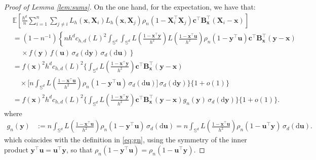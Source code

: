\documentclass[12pt]{report} %
\newcommand{\bX}{\mathbf{X}}
\newcommand{\bx}{\mathbf{x}}
\newcommand{\by}{\mathbf{y}}
\newcommand{\bc}{\mathbf{c}}
\newcommand{\bu}{\boldsymbol{u}}
\newcommand{\sigmad}{\sigma_{d}}
\newcommand{\rd}{\mathrm{d}}
\newcommand{\Sd}{\mathbb{S}^{d}}
\newcommand{\bB}{\mathbf{B}}
\begin{document}
\begin{proof}[Proof of Lemma \ref{lem:sums}]
On the one hand, for the expectation, we have that:
\begin{align}
&\mathbb{E}\!\left[
\frac{h^d}{n} \sum_{i=1}^n\sum_{j\neq i} 
L_h\left(\bx, \bX_i\right)L_h\left(\bx, \bX_j\right)
\rho_n\left(1-\bX_i^\top\bX_j\right)
\bc^\top\bB_{\bx}^\top\left(\bX_i -\bx\right)
\right] \nonumber \\
&= (1 - n^{-1}) \left\{
    n h^d c_{h,d}(L)^2
    \int_{\Sd} \int_{\Sd}
    L\!\left(\frac{1 - \bx^\top \by}{h^2}\right)
    L\!\left(\frac{1 - \bx^\top \bu}{h^2}\right)
    \rho_n\left(1 - \by^\top \bu\right) 
    \bc^\top\bB_{\bx}^\top\left(\by -\bx\right) \right. \nonumber \\
&\left. \quad \, \times f(\by)\, f(\bu)
    \,\sigmad(\rd\by)
    \,\sigmad(\rd\bu)
\right\}\nonumber \\
&= f(\bx)^2 h^d c_{h,d}(L)^2
\Biggl\{
\int_{\Sd}
L\!\left(\frac{1-\bx^\top\by}{h^2}\right)
\bc^\top\bB_{\bx}^\top(\by-\bx)
\nonumber\\
&\quad \times
\Biggl[
n \int_{\Sd}
L\!\left(\frac{1-\bx^\top\bu}{h^2}\right)
\rho_n(1-\by^\top\bu)
\,\sigmad(\rd\bu)
\Biggr]
\,\sigmad(\rd\by)
\Biggr\}
\{1+o(1)\}
\nonumber\\
&= f(\bx)^2 h^d c_{h,d}(L)^2
\Biggl\{
\int_{\Sd}
L\!\left(\frac{1-\bx^\top\by}{h^2}\right)
\bc^\top\bB_{\bx}^\top(\by-\bx)
g_n(\by)
\,\sigmad(\rd\by)
\Biggr\}
\{1+o(1)\}.
\label{eq:2expr1}
\end{align}
where
\begin{equation*}
\begin{aligned}
g_n(\by)
&:= n \int_{\Sd}
L\!\left(\frac{1-\bx^\top\bu}{h^2}\right)
\rho_n(1-\by^\top\bu)
\,\sigmad(\rd\bu)= n \int_{\Sd}
L\!\left(\frac{1-\bx^\top\bu}{h^2}\right)
\rho_n(1-\bu^\top\by)
\,\sigmad(\rd\bu).
\end{aligned}
\end{equation*}
which coincides with the definition in \eqref{eq:gn}, using the symmetry of the inner product $\by^\top\bu = \bu^\top\by$, so that $\rho_n(1-\by^\top\bu) = \rho_n(1-\bu^\top\by)$.


\end{proof}
\end{document}

